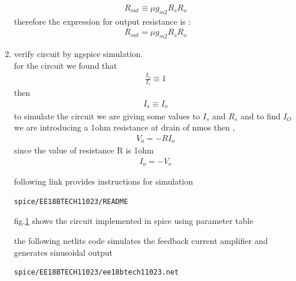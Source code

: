 \begin{enumerate}[label=\thesection.\arabic*.,ref=\thesection.\theenumi]
\begin{align}
    R_{out} \equiv \mu g_{m2}R_s R_o
     \label{eq_ee18btech11023_49}
\end{align}
therefore the expression for output resistance is :
\begin{align}
    R_{out} = \mu g_{m2}R_s R_o
     \label{eq_ee18btech11023_50}
\end{align}
\item
verify circuit by ngspice simulation.\\
for the circuit we found that 
\begin{align}
    \frac{I_o}{I_s} \equiv 1 
    \label{eq_ee18btech11023_51}
\end{align}
then 
\begin{align}
    I_s \equiv I_o
\end{align}
to simulate the circuit we are giving some values to $I_s$ and $R_s$
and to find $I_O$ we are introducing a  1ohm resistance at drain of nmos
then , 
\begin{align}
    V_o = -RI_o
    \label{eq_ee18btech11023_52}
\end{align}
since the value of resistance R is 1ohm
\begin{align}
    I_o = -V_o
    \label{eq_ee18btech11023_53}
\end{align}
\begin{table}[]
    \centering
  	\resizebox{\columnwidth}{!}{}
    \caption{}
    \label{table:ee18btech11023_2}
\end{table}
following link provides instructions for simulation
 \begin{lstlisting}
spice/EE18BTECH11023/README
\end{lstlisting}
fig.\ref{fig:spice fig} shows the circuit implemented in spice using parameter table
\begin{figure}[!ht]
	\begin{center}
			\resizebox{\columnwidth}{!}{}
	\end{center}
\caption{}
\label{fig:spice fig}
\end{figure}
 the following netlits code simulates the feedback current amplifier and generates sinusoidal output 
 \begin{lstlisting}
spice/EE18BTECH11023/ee18btech11023.net
\end{lstlisting}


\end{enumerate}
